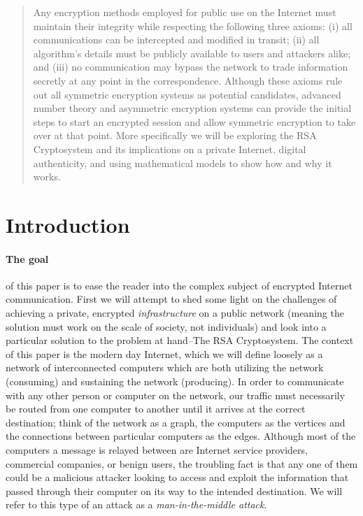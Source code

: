 \documentclass[12pt]{article}
\begin{document}
\maketitle

\begin{abstract}
Any encryption methods employed for public use on the Internet must maintain their integrity while respecting the following three axioms: (i) all communications can be intercepted and modified in transit; (ii) all algorithm's details must be publicly available to users and attackers alike; and (iii) no communication may bypass the network to trade information secretly at any point in the correspondence.  Although these axioms rule out all symmetric encryption systems as potential candidates, advanced number theory and asymmetric encryption systems can provide the initial steps to start an encrypted session and allow symmetric encryption to take over at that point.  More specifically we will be exploring the RSA Cryptosystem and its implications on a private Internet, digital authenticity, and using mathematical models to show how and why it works.  
\end{abstract}



\section{Introduction}

\paragraph{The goal} of this paper is to ease the reader into the complex subject of encrypted Internet communication.  First we will attempt to shed some light on the challenges of achieving a private, encrypted \textit{infrastructure} on a public network (meaning the solution must work on the scale of society, not individuals) and look into a particular solution to the problem at hand--The RSA Cryptosystem.  The context of this paper is the modern day Internet, which we will define loosely as a network of interconnected computers which are both utilizing the network (consuming) and sustaining the network (producing).  In order to communicate with any other person or computer on the network, our traffic must necessarily be routed from one computer to another until it arrives at the correct destination; think of the network as a graph, the computers as the vertices and the connections between particular computers as the edges.  Although most of the computers a message is relayed between are Internet service providers, commercial companies, or benign users, the troubling fact is that any one of them could be a malicious attacker looking to access and exploit the information that passed through their computer on its way to the intended destination.  We will refer to this type of an attack as a \textit{man-in-the-middle attack}.
\end{document}
